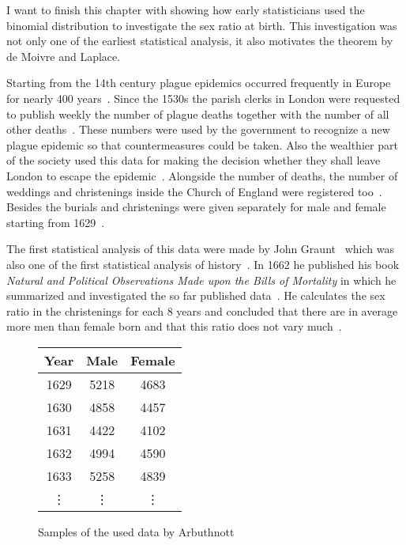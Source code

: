 I want to finish this chapter with showing how early statisticians used the binomial distribution to investigate the sex ratio at birth. This investigation was not only one of the earliest statistical analysis, it also motivates the theorem by de Moivre and Laplace.

Starting from the 14th century plague epidemics occurred frequently in Europe for nearly 400 years~\cite[p. 82]{hald1}. Since the 1530s the parish clerks in London were requested to publish weekly the number of plague deaths together with the number of all other deaths~\cite[p. 82]{hald1}. These numbers were used by the government to recognize a new plague epidemic so that countermeasures could be taken. Also the wealthier part of the society used this data for making the decision whether they shall leave London to escape the epidemic~\cite[pp. 82-83]{hald1}. Alongside the number of deaths, the number of weddings and christenings inside the Church of England were registered too~\cite[p. 83]{hald1}. Besides the burials and christenings were given separately for male and female starting from 1629~\cite[p. 83]{hald1}.

The first statistical analysis of this data were made by John Graunt~\cite[p. 83]{hald1} which was also one of the first statistical analysis of history~\cite[p. 81]{hald1}. In 1662 he published his book \emph{Natural and Political Observations Made upon the Bills of Mortality} in which he summarized and investigated the so far published data~\cite[pp. 81-105]{hald1}. He calculates the sex ratio in the christenings for each 8 years and concluded that there are in average more men than female born and that this ratio does not vary much~\cite[pp. 92-93]{hald1}.

\begin{figure}
  \begin{center}
    \begin{tabular}{c|c|c}
      Year & Male & Female \\
      \hline
      1629 & 5218 & 4683 \\
      1630 & 4858 & 4457 \\
      1631 & 4422 & 4102 \\
      1632 & 4994 & 4590 \\
      1633 & 5258 & 4839 \\
      \vdots & \vdots & \vdots
    \end{tabular}

    \caption{Samples of the used data by Arbuthnott~\cite[p. 276]{hald1}}
  \end{center}
\end{figure}

